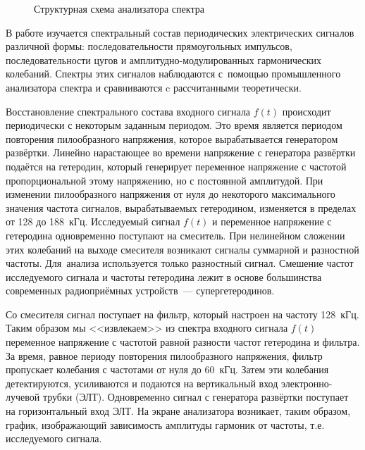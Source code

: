 

\begin{figure}[h!]
	\centering
	\caption{Структурная схема анализатора спектра}
\end{figure}

В работе изучается спектральный состав периодических электрических сигналов различной формы: последовательности прямоугольных импульсов, последовательности цугов и амплитудно-модулированных гармонических колебаний. Спектры этих сигналов наблюдаются с~помощью промышленного анализатора спектра и сравниваются c рассчитанными теоретически.

Восстановление спектрального состава входного сигнала $f(t)$ происходит периодически с некоторым заданным периодом. Это время является периодом повторения пилообразного напряжения, которое вырабатывается генератором развёртки. Линейно нарастающее во времени напряжение с генератора развёртки подаётся на гетеродин, который генерирует переменное напряжение с частотой пропорциональной этому напряжению, но с постоянной амплитудой. При изменении пилообразного напряжения от нуля до некоторого максимального значения частота сигналов, вырабатываемых гетеродином, изменяется в пределах от 128 до 188~кГц. Исследуемый сигнал $f(t)$ и переменное напряжение с гетеродина одновременно поступают на смеситель. При нелинейном сложении этих колебаний на выходе смесителя возникают сигналы суммарной и разностной частоты. Для~анализа используется только разностный сигнал. Смешение частот исследуемого сигнала и частоты гетеродина лежит в основе большинства современных радиоприёмных устройств~--- супергетеродинов.

Со смесителя сигнал поступает на фильтр, который настроен на частоту 128~кГц. Таким образом мы <<извлекаем>> из спектра входного  сигнала $f(t)$ переменное напряжение с частотой равной разности частот гетеродина и фильтра. За время, равное периоду повторения пилообразного напряжения, фильтр пропускает колебания с частотами от нуля до 60~кГц. Затем эти колебания детектируются, усиливаются и подаются на вертикальный вход электронно-лучевой трубки (ЭЛТ). Одновременно сигнал с генератора развёртки поступает на горизонтальный вход ЭЛТ. На экране анализатора возникает, таким образом, график, изображающий зависимость амплитуды гармоник от частоты, т.е.  исследуемого сигнала.


